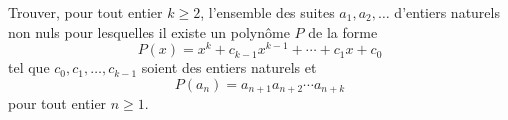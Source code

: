 Trouver, pour tout entier $k \geqslant 2$, l'ensemble des suites $a_1, a_2, \ldots$ d'entiers naturels non
nuls pour lesquelles il existe un polynôme $P$ de la forme
\[
P(x) = x^k + c_{k-1} x^{k-1} + \cdots + c_1 x + c_0
\]
tel que $c_0, c_1, \ldots, c_{k-1}$ soient des entiers naturels et
\[
P(a_n) = a_{n+1} a_{n+2} \cdots a_{n+k}
\]
pour tout entier $n \geqslant 1$.
